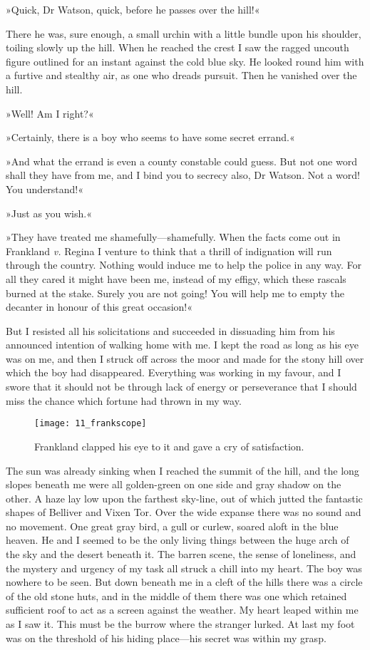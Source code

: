 »Quick, Dr Watson, quick, before he passes over the hill!«

There he was, sure enough, a small urchin with a little bundle upon his shoulder, toiling slowly up the hill. When he reached the crest I saw the ragged uncouth figure outlined for an instant against the cold blue sky. He looked round him with a furtive and stealthy air, as one who dreads pursuit. Then he vanished over the hill.

»Well! Am I right?«

»Certainly, there is a boy who seems to have some secret errand.«

»And what the errand is even a county constable could guess. But not one word shall they have from me, and I bind you to secrecy also, Dr Watson. Not a word! You understand!«

»Just as you wish.«

»They have treated me shamefully\allowbreak---\allowbreak shamefully. When the facts come out in Frankland \textit{v.} Regina I venture to think that a thrill of indignation will run through the country. Nothing would induce me to help the police in any way. For all they cared it might have been me, instead of my effigy, which these rascals burned at the stake. Surely you are not going! You will help me to empty the decanter in honour of this great occasion!«

But I resisted all his solicitations and succeeded in dissuading him from his announced intention of walking home with me. I kept the road as long as his eye was on me, and then I struck off across the moor and made for the stony hill over which the boy had disappeared. Everything was working in my favour, and I swore that it should not be through lack of energy or perseverance that I should miss the chance which fortune had thrown in my way.

\begin{figure}[tbh]
\centering
\texttt{[image: 11\_frankscope]}
\caption{Frankland clapped his eye to it and gave a cry of satisfaction.}
\end{figure}

The sun was already sinking when I reached the summit of the hill, and the long slopes beneath me were all golden-green on one side and gray shadow on the other. A haze lay low upon the farthest sky-line, out of which jutted the fantastic shapes of Belliver and Vixen Tor. Over the wide expanse there was no sound and no movement. One great gray bird, a gull or curlew, soared aloft in the blue heaven. He and I seemed to be the only living things between the huge arch of the sky and the desert beneath it. The barren scene, the sense of loneliness, and the mystery and urgency of my task all struck a chill into my heart. The boy was nowhere to be seen. But down beneath me in a cleft of the hills there was a circle of the old stone huts, and in the middle of them there was one which retained sufficient roof to act as a screen against the weather. My heart leaped within me as I saw it. This must be the burrow where the stranger lurked. At last my foot was on the threshold of his hiding place\allowbreak---\allowbreak his secret was within my grasp.

